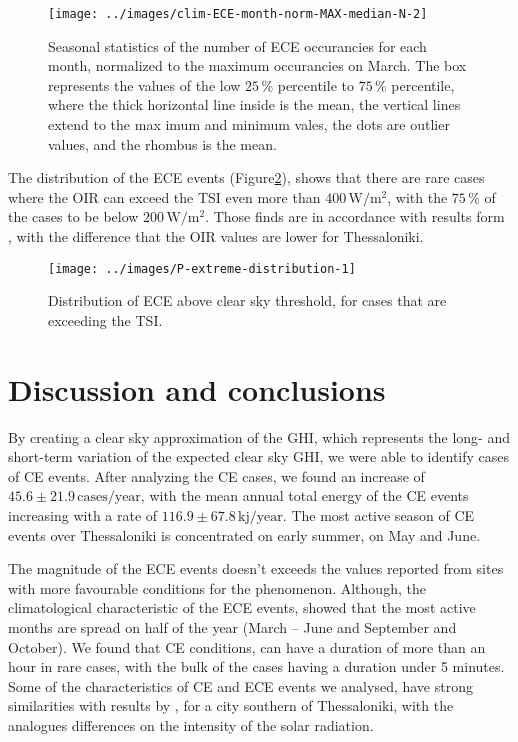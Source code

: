 \documentclass[preprint, 5p,
authoryear]{elsarticle} %
\begin{document}
\begin{figure}

{\centering \texttt{[image: ../images/clim-ECE-month-norm-MAX-median-N-2]} 

}

\caption{Seasonal statistics of the number of ECE occurancies for each month, normalized to the maximum occurancies on March. The box represents the values of the low $25\,\%$ percentile to $75\,\%$ percentile, where the thick horizontal line inside is the mean, the vertical lines extend to the max imum and minimum vales, the dots are outlier values, and the rhombus is the mean.}\label{fig:relative-month-occurancies-ECE}
\end{figure}

The distribution of the ECE events
(Figure\nobreakspace{}\ref{fig:P-extreme-distribution}), shows that
there are rare cases where the OIR can exceed the TSI even more than
\(400\,\text{W}/\text{m}^2\), with the \(75\,\%\) of the cases to be
below \(200\,\text{W}/\text{m}^2\). Those finds are in accordance with
results form \citet{Vamvakas2020}, with the difference that the OIR
values are lower for Thessaloniki.

\begin{figure}

{\centering \texttt{[image: ../images/P-extreme-distribution-1]} 

}

\caption{Distribution of ECE above clear sky threshold, for cases that are exceeding the TSI.}\label{fig:P-extreme-distribution}
\end{figure}

\hypertarget{discussion-and-conclusions}{%
\section{Discussion and conclusions}\label{discussion-and-conclusions}}

By creating a clear sky approximation of the GHI, which represents the
long- and short-term variation of the expected clear sky GHI, we were
able to identify cases of CE events. After analyzing the CE cases, we
found an increase of \(45.6\pm 21.9\,\text{cases}/\text{year}\), with
the mean annual total energy of the CE events increasing with a rate of
\(116.9\pm 67.8\,\text{kj}/\text{year}\). The most active season of CE
events over Thessaloniki is concentrated on early summer, on May and
June.

The magnitude of the ECE events doesn't exceeds the values reported from
sites with more favourable conditions for the phenomenon. Although, the
climatological characteristic of the ECE events, showed that the most
active months are spread on half of the year (March -- June and
September and October). We found that CE conditions, can have a duration
of more than an hour in rare cases, with the bulk of the cases having a
duration under 5 minutes. Some of the characteristics of CE and ECE
events we analysed, have strong similarities with results by
\citet{Vamvakas2020}, for a city southern of Thessaloniki, with the
analogues differences on the intensity of the solar radiation.
\end{document}
